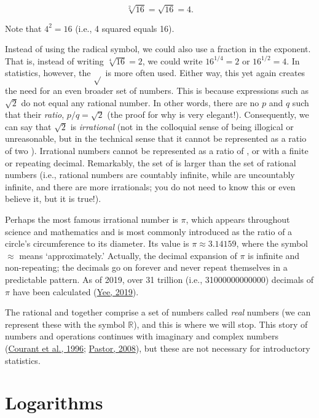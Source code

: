 \documentclass[
  openany]{krantz}
\begin{document}
\[\sqrt[2]{16} = \sqrt{16} = 4.\]

Note that \(4^{2} = 16\) (i.e., 4 squared equals 16).

Instead of using the radical symbol, we could also use a fraction in the exponent.
That is, instead of writing \(\sqrt[4]{16} = 2\), we could write \(16^{1/4} = 2\) or \(16^{1/2} = 4\).
In statistics, however, the \(\sqrt{}\) is more often used.
Either way, this yet again creates the need for an even broader set of numbers.
This is because expressions such as \(\sqrt{2}\) do not equal any rational number.
In other words, there are no  \(p\) and \(q\) such that their \emph{ratio}, \(p/q = \sqrt{2}\) (the proof for why is very elegant!).
Consequently, we can say that \(\sqrt{2}\) is \emph{irrational} (not in the colloquial sense of being illogical or unreasonable, but in the technical sense that it cannot be represented as a ratio of two ).
Irrational numbers cannot be represented as a ratio of , or with a finite or repeating decimal.
Remarkably, the set of  is larger than the set of rational numbers (i.e., rational numbers are countably infinite, while  are uncountably infinite, and there are more irrationals; you do not need to know this or even believe it, but it is true!).

Perhaps the most famous irrational number is \(\pi\), which appears throughout science and mathematics and is most commonly introduced as the ratio of a circle's circumference to its diameter.
Its value is \(\pi \approx 3.14159\), where the symbol \(\approx\) means `approximately.'
Actually, the decimal expansion of \(\pi\) is infinite and non-repeating; the decimals go on forever and never repeat themselves in a predictable pattern.
As of 2019, over 31 trillion (i.e., 31000000000000) decimals of \(\pi\) have been calculated (\protect\hyperlink{ref-Yee2019}{Yee, 2019}).

The rational and  together comprise a set of numbers called \emph{real} numbers (we can represent these with the symbol \(\mathbb{R}\)), and this is where we will stop.
This story of numbers and operations continues with imaginary and complex numbers (\protect\hyperlink{ref-Courant1996}{Courant et al., 1996}; \protect\hyperlink{ref-Pastor2008}{Pastor, 2008}), but these are not necessary for introductory statistics.

\hypertarget{logarithms}{%
\section{Logarithms}\label{logarithms}}
\end{document}
